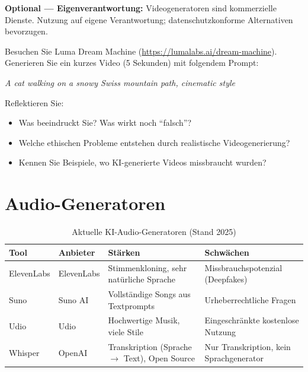 \begin{mychallenge}
\begin{myattention}
\textbf{Optional --- Eigenverantwortung:} Videogeneratoren sind kommerzielle Dienste.
Nutzung auf eigene Verantwortung; datenschutzkonforme Alternativen bevorzugen.
\end{myattention}

Besuchen Sie Luma Dream Machine (\url{https://lumalabs.ai/dream-machine}).
Generieren Sie ein kurzes Video (5 Sekunden) mit folgendem Prompt:
\begin{center}
    \textit{A cat walking on a snowy Swiss mountain path, cinematic style}
\end{center}

Reflektieren Sie:
\begin{itemize}
    \item Was beeindruckt Sie? Was wirkt noch \enquote{falsch}?
    \item Welche ethischen Probleme entstehen durch realistische Videogenerierung?
    \item Kennen Sie Beispiele, wo KI-generierte Videos missbraucht wurden?
\end{itemize}
\end{mychallenge}

\section{Audio-Generatoren}

\begin{table}[H]
\centering
\caption{Aktuelle KI-Audio-Generatoren (Stand 2025)}
\label{tab:audiogen-vergleich}
\small
\begin{tabular}{p{2.5cm}p{2.5cm}p{3.5cm}p{3.5cm}}
    \toprule
    \textbf{Tool}    & \textbf{Anbieter}   & \textbf{Stärken}                              & \textbf{Schwächen}                         \\
    \midrule
    ElevenLabs       & ElevenLabs          & Stimmenkloning, sehr natürliche Sprache        & Missbrauchspotenzial (Deepfakes)           \\
    \midrule
    Suno             & Suno AI             & Vollständige Songs aus Textprompts             & Urheberrechtliche Fragen                   \\
    \midrule
    Udio             & Udio                & Hochwertige Musik, viele Stile                 & Eingeschränkte kostenlose Nutzung          \\
    \midrule
    Whisper          & OpenAI              & Transkription (Sprache $\rightarrow$ Text), Open Source    & Nur Transkription, kein Sprachgenerator    \\
    \bottomrule
\end{tabular}
\end{table}

